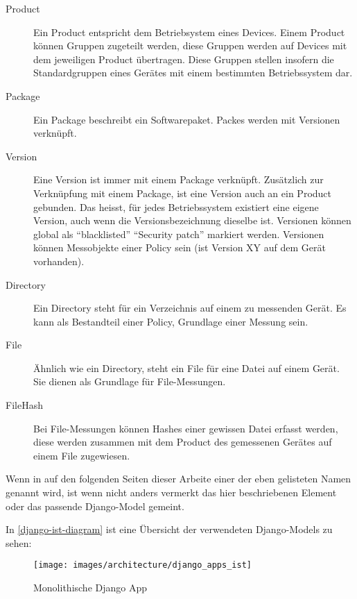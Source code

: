 \begin{description}
	\item[Product] Ein Product entspricht dem Betriebsystem eines Devices. Einem
	Product können Gruppen zugeteilt werden, diese Gruppen werden auf Devices mit
	dem jeweiligen Product übertragen. Diese Gruppen stellen insofern die
	Standardgruppen eines Gerätes mit einem bestimmten Betriebssystem dar.
	
	\item[Package] Ein Package beschreibt ein Softwarepaket. Packes werden mit Versionen verknüpft.
	
	\item[Version] Eine Version ist immer mit einem Package verknüpft. 
	Zusätzlich zur Verknüpfung mit einem Package, ist eine Version auch an ein Product gebunden.
	Das heisst, für jedes Betriebssystem existiert eine eigene Version, auch wenn die Versionsbezeichnung dieselbe ist.
	Versionen können global als \enquote{blacklisted} \enquote{Security patch} markiert werden.
	Versionen können Messobjekte einer Policy sein (ist Version XY auf dem Gerät vorhanden).
		
	\item[Directory] Ein Directory steht für ein Verzeichnis auf einem zu messenden
	Gerät. Es kann als Bestandteil einer Policy, Grundlage einer Messung sein.
	
	\item[File] Ähnlich wie ein Directory, steht ein File für eine Datei auf einem
	Gerät. Sie dienen als Grundlage für File-Messungen.
	
	\item[FileHash] Bei File-Messungen können Hashes einer gewissen Datei erfasst
	werden, diese werden zusammen mit dem Product des gemessenen Gerätes auf einem
	File zugewiesen.
	
\end{description}

Wenn in auf den folgenden Seiten dieser Arbeite einer der eben gelisteten Namen
genannt wird, ist wenn nicht anders vermerkt das hier beschriebenen Element oder
das passende Django-Model gemeint.

In \autoref{django-ist-diagram} ist eine Übersicht der verwendeten Django-Models
zu sehen:
\begin{figure}[H]
	\centering
	\texttt{[image: images/architecture/django\_apps\_ist]}
    \caption{Monolithische Django App}
    \label{django-ist-diagram}
\end{figure}

